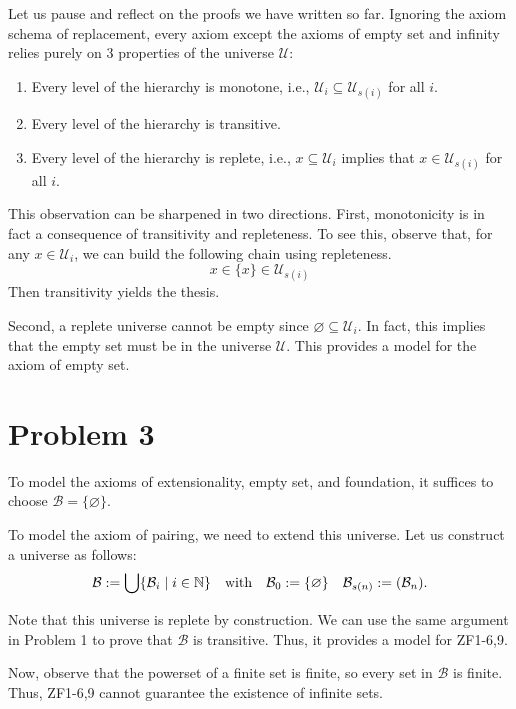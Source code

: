 \documentclass[a4paper]{article}
\newcommand{\N}{\mathbb{N}}
\let\P\relax
\newcommand{\P}{\mathcal{P}}
\newcommand{\U}{\mathcal{U}}
\newcommand{\B}{\mathcal{B}}
\begin{document}
\begin{remark}
  Let us pause and reflect on the proofs we have written so far.
  Ignoring the axiom schema of replacement, every axiom except the axioms of empty set and infinity relies purely on 3 properties of the universe $\U$:
  \begin{enumerate}
  \item Every level of the hierarchy is monotone, i.e., $\U_{i} \subseteq \U_{s(i)}$ for all $i$.
  \item Every level of the hierarchy is transitive.
  \item Every level of the hierarchy is replete, i.e., $x \subseteq \U_{i}$ implies that $x \in \U_{s(i)}$ for all $i$.
  \end{enumerate}
  This observation can be sharpened in two directions.
  First, monotonicity is in fact a consequence of transitivity and repleteness.
  To see this, observe that, for any $x \in \U_{i}$, we can build the following chain using repleteness.
  \[
    x \in \{x\} \in \U_{s(i)}
  \]
  Then transitivity yields the thesis.

  Second, a replete universe cannot be empty since $\varnothing \subseteq \U_{i}$.
  In fact, this implies that the empty set must be in the universe $\U$.
  This provides a model for the axiom of empty set.
\end{remark}

\section*{Problem 3}
To model the axioms of extensionality, empty set, and foundation, it suffices to choose $\B = \{\varnothing\}$.

To model the axiom of pairing, we need to extend this universe.
Let us construct a universe as follows:
\begin{align*}
  \B := \bigcup\{\B_{i} \mid i \in \N\} && \text{with} && \B_{0} := \{\varnothing\} && \B_{s(n)} := \P(\B_{n}).
\end{align*}

Note that this universe is replete by construction.
We can use the same argument in Problem 1 to prove that $\B$ is transitive.
Thus, it provides a model for ZF1-6,9.

Now, observe that the powerset of a finite set is finite, so every set in $\B$ is finite.
Thus, ZF1-6,9 cannot guarantee the existence of infinite sets.



\end{document}
